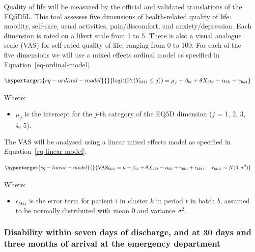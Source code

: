 \documentclass[
]{scrartcl}
\providecommand{\tightlist}{%
  \setlength{\itemsep}{0pt}\setlength{\parskip}{0pt}}\usepackage{longtable,booktabs,array}
\begin{document}
Quality of life will be measured by the official and validated
translations of the EQ5D5L. This tool assesses five dimensions of
health-related quality of life: mobility, self-care, usual activities,
pain/discomfort, and anxiety/depression. Each dimension is rated on a
likert scale from 1 to 5. There is also a visual analogue scale (VAS)
for self-rated quality of life, ranging from 0 to 100. For each of the
five dimensions we will use a mixed effects ordinal model as specified
in Equation~\ref{eq-ordinal-model}.

\begin{equation}\protect\hypertarget{eq-ordinal-model}{}{
\text{logit}(\text{Pr}(Y_{bkti} \leq j)) = \mu_j + \beta_{bt} + \theta X_{bkt} + \alpha_{bk} + \gamma_{bkt}
}\label{eq-ordinal-model}\end{equation}

Where:

\begin{itemize}
\tightlist
\item
  \(\mu_j\) is the intercept for the \(j\)-th category of the EQ5D
  dimension (\(j\) = 1, 2, 3, 4, 5).
\end{itemize}

The VAS will be analysed using a linear mixed effects model as specified
in Equation~\ref{eq-linear-model}.

\begin{equation}\protect\hypertarget{eq-linear-model}{}{
\text{VAS}_{bkti} = \mu + \beta_{bt} + \theta X_{bkt} + \alpha_{bk} + \gamma_{bkt} + \epsilon_{bkti}, \quad \epsilon_{bkti} \sim N(0, \sigma^2)
}\label{eq-linear-model}\end{equation}

Where:

\begin{itemize}
\tightlist
\item
  \(\epsilon_{bkti}\) is the error term for patient \(i\) in cluster
  \(k\) in period \(t\) in batch \(b\), assumed to be normally
  distributed with mean 0 and variance \(\sigma^2\).
\end{itemize}

\hypertarget{disability-within-seven-days-of-discharge-and-at-30-days-and-three-months-of-arrival-at-the-emergency-department}{%
\subsubsection{Disability within seven days of discharge, and at 30 days
and three months of arrival at the emergency
department}\label{disability-within-seven-days-of-discharge-and-at-30-days-and-three-months-of-arrival-at-the-emergency-department}}
\end{document}
